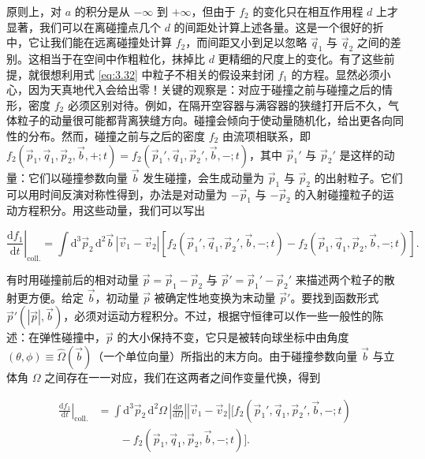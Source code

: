 原则上，对 $a$ 的积分是从 $-\infty$ 到 $+\infty$，但由于 $f_2$ 的变化只在相互作用程 $d$ 上才显著，我们可以在离碰撞点几个 $d$ 的间距处计算上述各量。这是一个很好的折中，它让我们能在远离碰撞处计算 $f_2$，而间距又小到足以忽略 $\vec q_1$ 与 $\vec q_2$ 之间的差别。这相当于在空间中作粗粒化，抹掉比 $d$ 更精细的尺度上的变化。有了这些前提，就很想利用式 \eqref{eq:3.32} 中粒子不相关的假设来封闭 $f_1$ 的方程。显然必须小心，因为天真地代入会给出零！关键的观察是：对应于碰撞之前与碰撞之后的情形，密度 $f_2$ 必须区别对待。例如，在隔开空容器与满容器的狭缝打开后不久，气体粒子的动量很可能都背离狭缝方向。碰撞会倾向于使动量随机化，给出更各向同性的分布。然而，碰撞之前与之后的密度 $f_2$ 由流项相联系，即 $f_2(\vec p_1,\vec q_1,\vec p_2,\vec b,+;t)=f_2(\vec p_1',\vec q_1,\vec p_2',\vec b,-;t)$，其中 $\vec p_1'$ 与 $\vec p_2'$ 是这样的动量：它们以碰撞参数向量 $\vec b$ 发生碰撞，会生成动量为 $\vec p_1$ 与 $\vec p_2$ 的出射粒子。它们可以用时间反演对称性得到，办法是对动量为 $-\vec p_1$ 与 $-\vec p_2$ 的入射碰撞粒子的运动方程积分。用这些动量，我们可以写出

\begin{equation}\label{eq:3.37}
  \left.\frac{\mathrm{d}f_1}{\mathrm{d}t}\right|_{\text{coll.}}=\int \mathrm{d}^3\vec p_2\,\mathrm{d}^2\vec b\,|\vec v_1-\vec v_2|\left[f_2(\vec p_1',\vec q_1,\vec p_2',\vec b,-;t)-f_2(\vec p_1,\vec q_1,\vec p_2,\vec b,-;t)\right].
\end{equation}

有时用碰撞前后的相对动量 $\vec p=\vec p_1-\vec p_2$ 与 $\vec p'=\vec p_1'-\vec p_2'$ 来描述两个粒子的散射更方便。给定 $\vec b$，初动量 $\vec p$ 被确定性地变换为末动量 $\vec p'$。要找到函数形式 $\vec p'(|\vec p|,\vec b)$，必须对运动方程积分。不过，根据守恒律可以作一些一般性的陈述：在弹性碰撞中，$\vec p$ 的大小保持不变，它只是被转向球坐标中由角度 $(\theta,\phi)\equiv\hat\Omega(\vec b)$（一个单位向量）所指出的末方向。由于碰撞参数向量 $\vec b$ 与立体角 $\Omega$ 之间存在一一对应，我们在这两者之间作变量代换，得到

\begin{equation}\label{eq:3.38}
  \begin{aligned}
    \left.\frac{\mathrm{d}f_1}{\mathrm{d}t}\right|_{\text{coll.}}&=\int \mathrm{d}^3\vec p_2\,\mathrm{d}^2\Omega\,\left|\frac{\mathrm{d}\sigma}{\mathrm{d}\Omega}\right||\vec v_1-\vec v_2|\Big[f_2(\vec p_1',\vec q_1,\vec p_2',\vec b,-;t)\\
    &\qquad-f_2(\vec p_1,\vec q_1,\vec p_2,\vec b,-;t)\Big].
  \end{aligned}
\end{equation}

